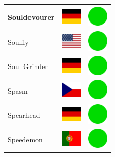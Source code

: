 \documentclass[12pt, a4paper, twoside]{report}
\begin{document}
\begin{center}
\begin{longtable}{|p{5cm}|p{2cm}|p{2cm}|}
 Souldevourer                                               & \includegraphics[width=1cm]{../4x3/de} &   \includegraphics[width=1cm]{../likes/y} \\ \hline
 Soulfly                                                    & \includegraphics[width=1cm]{../4x3/us} &   \includegraphics[width=1cm]{../likes/y} \\ \hline
 Soul Grinder                                               & \includegraphics[width=1cm]{../4x3/de} &   \includegraphics[width=1cm]{../likes/y} \\ \hline
 Spasm                                                      & \includegraphics[width=1cm]{../4x3/cz} &   \includegraphics[width=1cm]{../likes/y} \\ \hline
 Spearhead                                                  & \includegraphics[width=1cm]{../4x3/de} &   \includegraphics[width=1cm]{../likes/y} \\ \hline
 Speedemon                                                  & \includegraphics[width=1cm]{../4x3/pt} &   \includegraphics[width=1cm]{../likes/y} \\ \hline

\end{longtable}
\end{center}
\end{document}
